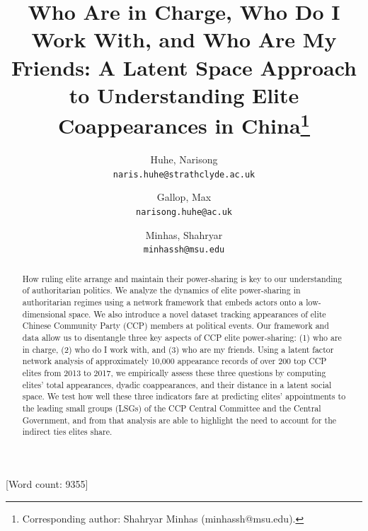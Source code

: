 \documentclass[11pt,english]{article}
\date{}
\begin{document}
\begin{spacing}{1}

\author{
  Huhe, Narisong\\
  \texttt{naris.huhe@strathclyde.ac.uk}
  \and
  Gallop, Max\\
  \texttt{narisong.huhe@ac.uk}
  \and
  Minhas, Shahryar\\
  \texttt{minhassh@msu.edu}
}

\title{\textbf{Who Are in Charge, Who Do I Work With, and Who Are My Friends:
A Latent Space Approach to Understanding Elite Coappearances in China}\thanks{Corresponding author: Shahryar Minhas (minhassh@msu.edu).}}


\maketitle
\begin{abstract}
\begin{flushleft}

How ruling elite arrange and maintain their power-sharing is key to our understanding of authoritarian politics. We analyze the dynamics of elite power-sharing in authoritarian regimes using a network framework that embeds actors onto a low-dimensional space. We also introduce a novel dataset tracking appearances of elite Chinese Community Party (CCP) members at political events. Our framework and data allow us to disentangle three key aspects of CCP elite power-sharing: (1) who are in charge, (2) who do I work with, and (3) who are my friends. Using a latent factor network analysis of approximately 10,000 appearance records of over 200 top CCP elites from 2013 to 2017, we empirically assess these three questions by computing elites' total appearances, dyadic coappearances, and their distance in a latent social space. We test how well these three indicators fare at predicting elites' appointments to the leading small groups (LSGs) of the CCP Central Committee and the Central Government, and from that analysis are able to highlight the need to account for the indirect ties elites share.

\end{flushleft}
\end{abstract}
\end{spacing}
[Word count: 9355]
\newpage{}
\end{document}

